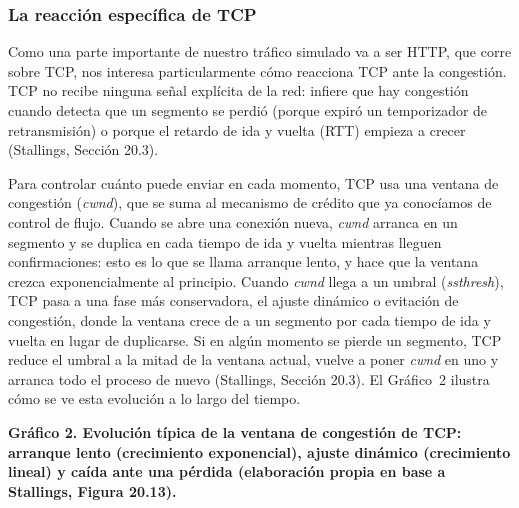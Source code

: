 \documentclass[11pt,a4paper]{article}
\newcommand{\figcaption}[1]{\par\noindent\footnotesize\textbf{#1}\par\vspace{0.4cm}}
\begin{document}
\subsubsection*{La reacci\'on espec\'ifica de TCP}

Como una parte importante de nuestro tr\'afico simulado va a ser HTTP, que corre sobre TCP, nos interesa particularmente c\'omo reacciona TCP ante la congesti\'on. TCP no recibe ninguna se\~nal expl\'icita de la red: infiere que hay congesti\'on cuando detecta que un segmento se perdi\'o (porque expir\'o un temporizador de retransmisi\'on) o porque el retardo de ida y vuelta (RTT) empieza a crecer (Stallings, Secci\'on 20.3).

Para controlar cu\'anto puede enviar en cada momento, TCP usa una ventana de congesti\'on (\textit{cwnd}), que se suma al mecanismo de cr\'edito que ya conoc\'iamos de control de flujo. Cuando se abre una conexi\'on nueva, \textit{cwnd} arranca en un segmento y se duplica en cada tiempo de ida y vuelta mientras lleguen confirmaciones: esto es lo que se llama arranque lento, y hace que la ventana crezca exponencialmente al principio. Cuando \textit{cwnd} llega a un umbral (\textit{ssthresh}), TCP pasa a una fase m\'as conservadora, el ajuste din\'amico o evitaci\'on de congesti\'on, donde la ventana crece de a un segmento por cada tiempo de ida y vuelta en lugar de duplicarse. Si en alg\'un momento se pierde un segmento, TCP reduce el umbral a la mitad de la ventana actual, vuelve a poner \textit{cwnd} en uno y arranca todo el proceso de nuevo (Stallings, Secci\'on 20.3). El Gr\'afico~2 ilustra c\'omo se ve esta evoluci\'on a lo largo del tiempo.

\needspace{1cm}
\begin{center}
\begin{minipage}{0.96\linewidth}
\centering
{}
\figcaption{Gr\'afico 2. Evoluci\'on t\'ipica de la ventana de congesti\'on de TCP: arranque lento (crecimiento exponencial), ajuste din\'amico (crecimiento lineal) y ca\'ida ante una p\'erdida (elaboraci\'on propia en base a Stallings, Figura 20.13).}
\end{minipage}
\end{center}
\end{document}

